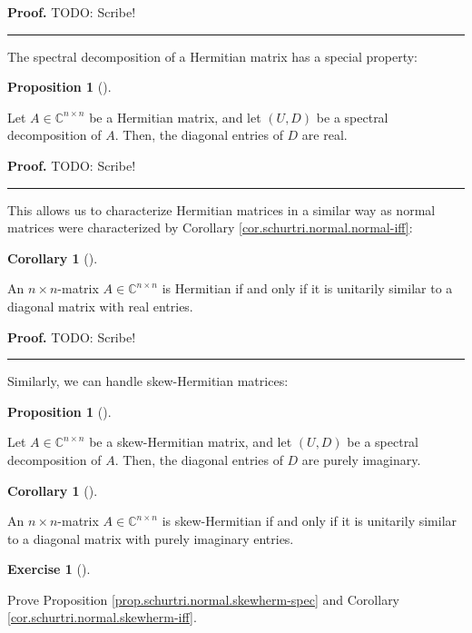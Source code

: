 \documentclass[numbers=enddot,12pt,final,onecolumn,notitlepage]{scrartcl}%
\newcounter{exer}
\numberwithin{exer}{subsection}
\theoremstyle{definition}
\newtheorem{prop}[theo]{Proposition}
\newenvironment{proposition}[1][]
{\begin{prop}[#1]\begin{leftbar}}
{\end{leftbar}\end{prop}}
\newtheorem{coro}[theo]{Corollary}
\newenvironment{corollary}[1][]
{\begin{coro}[#1]\begin{leftbar}}
{\end{leftbar}\end{coro}}
\newtheorem{exmp}[exer]{Exercise}
\newenvironment{exercise}[1][]
{\begin{exmp}[#1]\begin{leftbar}}
{\end{leftbar}\end{exmp}}
\newenvironment{proof}[1][Proof]{\noindent\textbf{#1.} }{\ \rule{0.5em}{0.5em}}
\begin{document}
\begin{proof}
TODO: Scribe!
\end{proof}

The spectral decomposition of a Hermitian matrix has a special property:

\begin{proposition}
\label{prop.schurtri.normal.hermitian-spec}Let $A\in\mathbb{C}^{n\times n}$ be
a Hermitian matrix, and let $\left(  U,D\right)  $ be a spectral decomposition
of $A$. Then, the diagonal entries of $D$ are real.
\end{proposition}

\begin{proof}
TODO: Scribe!
\end{proof}

This allows us to characterize Hermitian matrices in a similar way as normal
matrices were characterized by Corollary \ref{cor.schurtri.normal.normal-iff}:

\begin{corollary}
\label{cor.schurtri.normal.hermitian-iff}An $n\times n$-matrix $A\in
\mathbb{C}^{n\times n}$ is Hermitian if and only if it is unitarily similar to
a diagonal matrix with real entries.
\end{corollary}

\begin{proof}
TODO: Scribe!
\end{proof}

Similarly, we can handle skew-Hermitian matrices:

\begin{proposition}
\label{prop.schurtri.normal.skewherm-spec}Let $A\in\mathbb{C}^{n\times n}$ be
a skew-Hermitian matrix, and let $\left(  U,D\right)  $ be a spectral
decomposition of $A$. Then, the diagonal entries of $D$ are purely imaginary.
\end{proposition}

\begin{corollary}
\label{cor.schurtri.normal.skewherm-iff}An $n\times n$-matrix $A\in
\mathbb{C}^{n\times n}$ is skew-Hermitian if and only if it is unitarily
similar to a diagonal matrix with purely imaginary entries.
\end{corollary}

\begin{exercise}
\label{exe.schurtri.normal.skewherm} Prove Proposition
\ref{prop.schurtri.normal.skewherm-spec} and Corollary
\ref{cor.schurtri.normal.skewherm-iff}.
\end{exercise}
\end{document}
